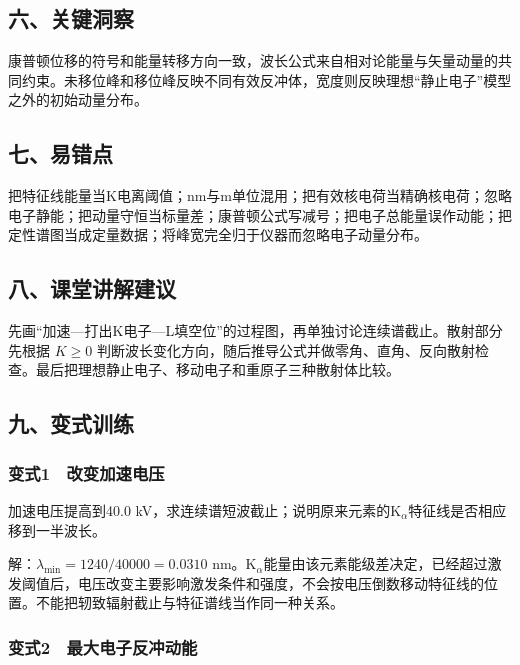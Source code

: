 \documentclass[12pt,a4paper,fontset=fandol]{ctexart}
\begin{document}
\subsection{六、关键洞察}\label{ux516dux5173ux952eux6d1eux5bdf-7}

康普顿位移的符号和能量转移方向一致，波长公式来自相对论能量与矢量动量的共同约束。未移位峰和移位峰反映不同有效反冲体，宽度则反映理想``静止电子''模型之外的初始动量分布。

\subsection{七、易错点}\label{ux4e03ux6613ux9519ux70b9-7}

把特征线能量当K电离阈值；nm与m单位混用；把有效核电荷当精确核电荷；忽略电子静能；把动量守恒当标量差；康普顿公式写减号；把电子总能量误作动能；把定性谱图当成定量数据；将峰宽完全归于仪器而忽略电子动量分布。

\subsection{八、课堂讲解建议}\label{ux516bux8bfeux5802ux8bb2ux89e3ux5efaux8bae-7}

先画``加速---打出K电子---L填空位''的过程图，再单独讨论连续谱截止。散射部分先根据
\(K\ge0\)
判断波长变化方向，随后推导公式并做零角、直角、反向散射检查。最后把理想静止电子、移动电子和重原子三种散射体比较。

\subsection{九、变式训练}\label{ux4e5dux53d8ux5f0fux8badux7ec3-7}

\subsubsection{变式1　改变加速电压}\label{ux53d8ux5f0f1-ux6539ux53d8ux52a0ux901fux7535ux538b}

加速电压提高到40.0
kV，求连续谱短波截止；说明原来元素的K\(_\alpha\)特征线是否相应移到一半波长。

解：\(\lambda_{\min}=1240/40000=0.0310\)
nm。K\(_\alpha\)能量由该元素能级差决定，已经超过激发阈值后，电压改变主要影响激发条件和强度，不会按电压倒数移动特征线的位置。不能把轫致辐射截止与特征谱线当作同一种关系。

\subsubsection{变式2　最大电子反冲动能}\label{ux53d8ux5f0f2-ux6700ux5927ux7535ux5b50ux53cdux51b2ux52a8ux80fd}
\end{document}
